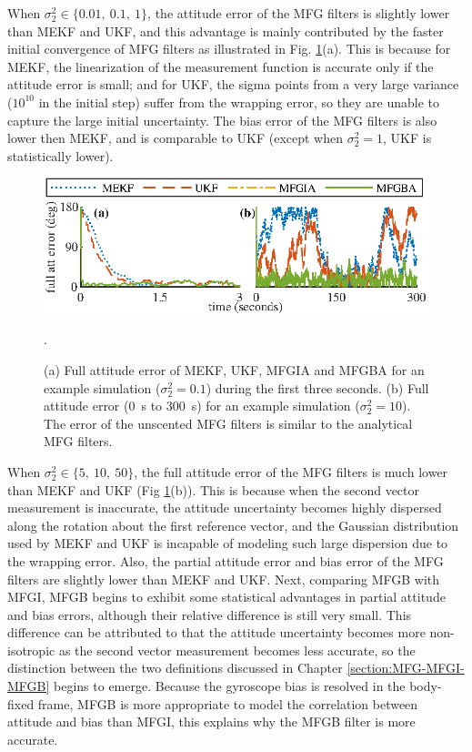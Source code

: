When $\sigma_2^2 \in \{0.01,\ 0.1,\ 1\}$, the attitude error of the MFG filters is slightly lower than MEKF and UKF, and this advantage is mainly contributed by the faster initial convergence of MFG filters as illustrated in Fig. \ref{fig:attEst-sim2-trajectory-att}(a).
This is because for MEKF, the linearization of the measurement function is accurate only if the attitude error is small; and for UKF, the sigma points from a very large variance ($10^{10}$ in the initial step) suffer from the wrapping error, so they are unable to capture the large initial uncertainty.
The bias error of the MFG filters is also lower then MEKF, and is comparable to UKF (except when $\sigma_2^2=1$, UKF is statistically lower).

\begin{figure}
	\centering
	\includegraphics[scale=1.4]{figures/attEst-sim2-trajectory-att}
	\caption[Full attitude error for example simulations.]{(a) Full attitude error of MEKF, UKF, MFGIA and MFGBA for an example simulation ($\sigma_2^2 = 0.1$) during the first three seconds.
		(b) Full attitude error (\SI{0}{\second} to \SI{300}{\second}) for an example simulation ($\sigma_2^2 = 10$).
		The error of the unscented MFG filters is similar to the analytical MFG filters. \label{fig:attEst-sim2-trajectory-att}}.
\end{figure}

When $\sigma_2^2 \in \{5,\ 10,\ 50\}$, the full attitude error of the MFG filters is much lower than MEKF and UKF (Fig \ref{fig:attEst-sim2-trajectory-att}(b)).
This is because when the second vector measurement is inaccurate, the attitude uncertainty becomes highly dispersed along the rotation about the first reference vector, and the Gaussian distribution used by MEKF and UKF is incapable of modeling such large dispersion due to the wrapping error.
Also, the partial attitude error and bias error of the MFG filters are slightly lower than MEKF and UKF.
Next, comparing MFGB with MFGI, MFGB begins to exhibit some statistical advantages in partial attitude and bias errors, although their relative difference is still very small.
This difference can be attributed to that the attitude uncertainty becomes more non-isotropic as the second vector measurement becomes less accurate, so the distinction between the two definitions discussed in Chapter \ref{section:MFG-MFGI-MFGB} begins to emerge.
Because the gyroscope bias is resolved in the body-fixed frame, MFGB is more appropriate to model the correlation between attitude and bias than MFGI, this explains why the MFGB filter is more accurate.

